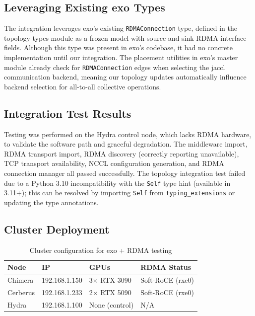 \documentclass[10pt,letterpaper]{article}
\begin{document}
\subsection{Leveraging Existing exo Types}

The integration leverages exo's existing \texttt{RDMAConnection} type, defined in the topology types module as a frozen model with source and sink RDMA interface fields. Although this type was present in exo's codebase, it had no concrete implementation until our integration. The placement utilities in exo's master module already check for \texttt{RDMAConnection} edges when selecting the jaccl communication backend, meaning our topology updates automatically influence backend selection for all-to-all collective operations.

\subsection{Integration Test Results}

Testing was performed on the Hydra control node, which lacks RDMA hardware, to validate the software path and graceful degradation. The middleware import, RDMA transport import, RDMA discovery (correctly reporting unavailable), TCP transport availability, NCCL configuration generation, and RDMA connection manager all passed successfully. The topology integration test failed due to a Python 3.10 incompatibility with the \texttt{Self} type hint (available in 3.11+); this can be resolved by importing \texttt{Self} from \texttt{typing\_extensions} or updating the type annotations.

\subsection{Cluster Deployment}

\begin{table}[H]
\centering
\small
\begin{tabular}{@{}llll@{}}
\toprule
\textbf{Node} & \textbf{IP} & \textbf{GPUs} & \textbf{RDMA Status} \\
\midrule
Chimera & 192.168.1.150 & 3$\times$ RTX 3090 & Soft-RoCE (rxe0) \\
Cerberus & 192.168.1.233 & 2$\times$ RTX 5090 & Soft-RoCE (rxe0) \\
Hydra & 192.168.1.100 & None (control) & N/A \\
\bottomrule
\end{tabular}
\caption{Cluster configuration for exo + RDMA testing}
\end{table}
\end{document}
